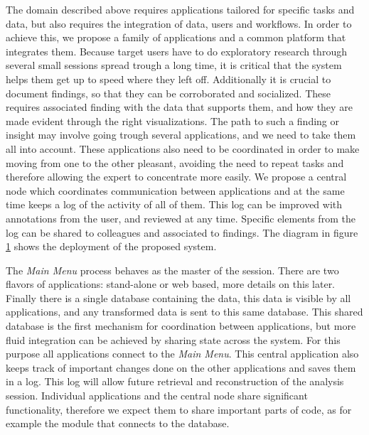 The domain described above requires applications tailored for specific tasks and data, but also requires the integration of data, users and workflows. In order to achieve this, we propose a family of applications and a common platform that integrates them. Because target users have to do exploratory research through several small sessions spread trough a long time, it is critical that the system helps them get up to speed where they left off. Additionally it is crucial to document findings, so that they can be corroborated and socialized. These requires associated finding with the data that supports them, and how they are made evident through the right visualizations. The path to such a finding or insight may involve going trough several applications, and we need to take them all into account. These applications also need to be coordinated in order to make moving from one to the other pleasant, avoiding the need to repeat tasks and therefore allowing the expert to concentrate more easily. We propose a central node which coordinates communication between applications and at the same time keeps a log of the activity of all of them. This log can be improved with annotations from the user, and reviewed at any time. Specific elements from the log can be shared to colleagues and associated to findings. The diagram in figure \ref{fig_deployment} shows the deployment of the proposed system.

\begin{figure}
\caption{\label{fig_deployment}}
\end{figure}

The \emph{Main Menu} process behaves as the master of the session. There are two flavors of applications: stand-alone or web based, more details on this later. Finally there is a single database containing the data, this data is visible by all applications, and any transformed data is sent to this same database. This shared database is the first mechanism for coordination between applications, but more fluid integration can be achieved by sharing state across the system. For this purpose all applications connect to the \emph{Main Menu}. This central application also keeps track of important changes done on the other applications and saves them in a log. This log will allow future retrieval and reconstruction of the analysis session. Individual applications and the central node share significant functionality, therefore we expect them to share important parts of code, as for example the module that connects to the database.
 
